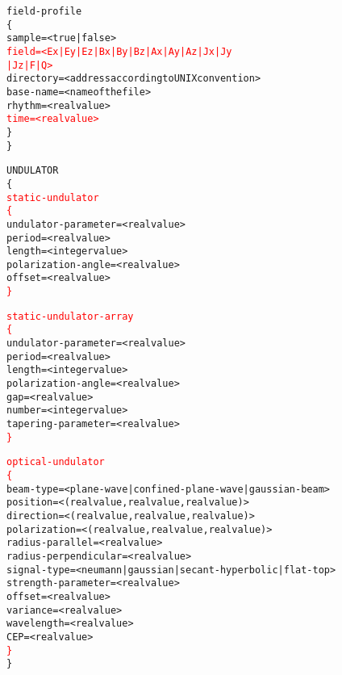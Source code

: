 \documentclass[a4paper]{article}
\begin{document}
\begin{alltt}
\tabto{0.3cm}field-profile
\tabto{0.3cm}\{
\tabto{0.6cm}sample \tabto{6cm} = < true | false >
\tabto{0.6cm}\textcolor{red}{field \tabto{6cm} = < Ex | Ey | Ez | Bx | By | Bz | Ax | Ay | Az | Jx | Jy 
\tabto{6.3cm}| Jz | F | Q >}
\tabto{0.6cm}directory \tabto{6cm} = < address according to UNIX convention >
\tabto{0.6cm}base-name \tabto{6cm} = < name of the file >
\tabto{0.6cm}rhythm \tabto{6cm} = < real value >
\tabto{0.6cm}\textcolor{red}{time \tabto{6cm} = < real value >}
\tabto{0.3cm}\}
\}

UNDULATOR
\{
\tabto{0.3cm}\textcolor{red}{static-undulator}
\tabto{0.3cm}\textcolor{red}{\{}
\tabto{0.6cm}undulator-parameter \tabto{6cm} = < real value >
\tabto{0.6cm}period \tabto{6cm} = < real value >
\tabto{0.6cm}length \tabto{6cm} = < integer value >
\tabto{0.6cm}polarization-angle \tabto{6cm} = < real value >
\tabto{0.6cm}offset \tabto{6cm} = < real value >
\tabto{0.3cm}\textcolor{red}{\}}

\tabto{0.3cm}\textcolor{red}{static-undulator-array}
\tabto{0.3cm}\textcolor{red}{\{}
\tabto{0.6cm}undulator-parameter \tabto{6cm} = < real value >
\tabto{0.6cm}period \tabto{6cm} = < real value >
\tabto{0.6cm}length \tabto{6cm} = < integer value >
\tabto{0.6cm}polarization-angle \tabto{6cm} = < real value >
\tabto{0.6cm}gap \tabto{6cm} = < real value >
\tabto{0.6cm}number \tabto{6cm} = < integer value >
\tabto{0.6cm}tapering-parameter \tabto{6cm} = < real value > 
\tabto{0.3cm}\textcolor{red}{\}}

\tabto{0.3cm}\textcolor{red}{optical-undulator}
\tabto{0.3cm}\textcolor{red}{\{}
\tabto{0.6cm}beam-type \tabto{6cm} = < plane-wave | confined-plane-wave | gaussian-beam >
\tabto{0.6cm}position \tabto{6cm} = < ( real value , real value , real value ) >
\tabto{0.6cm}direction \tabto{6cm} = < ( real value , real value , real value ) >
\tabto{0.6cm}polarization \tabto{6cm} = < ( real value , real value , real value ) >
\tabto{0.6cm}radius-parallel \tabto{6cm} = < real value >
\tabto{0.6cm}radius-perpendicular \tabto{6cm} = < real value >
\tabto{0.6cm}signal-type \tabto{6cm} = < neumann | gaussian | secant-hyperbolic | flat-top >
\tabto{0.6cm}strength-parameter \tabto{6cm} = < real value >
\tabto{0.6cm}offset \tabto{6cm} = < real value >
\tabto{0.6cm}variance \tabto{6cm} = < real value >
\tabto{0.6cm}wavelength \tabto{6cm} = < real value >
\tabto{0.6cm}CEP \tabto{6cm} = < real value >
\tabto{0.3cm}\textcolor{red}{\}}
\}


\end{alltt}
\end{document}
